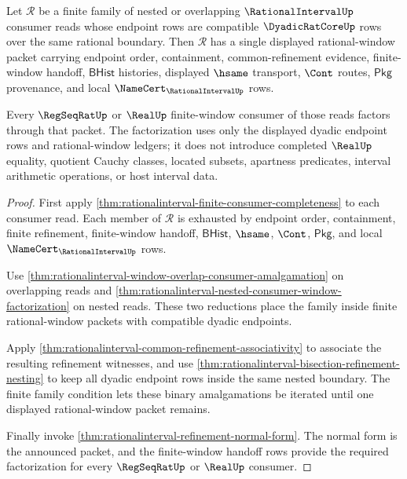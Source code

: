 



\begin{theorem}
\label{thm:rationalinterval-dyadic-nested-amalgamation-normal-form}
Let $\mathcal{R}$ be a finite family of nested or overlapping
$\RationalIntervalUp$ consumer reads whose endpoint rows are compatible
$\DyadicRatCoreUp$ rows over the same rational boundary. Then $\mathcal{R}$ has
a single displayed rational-window packet carrying endpoint order, containment,
common-refinement evidence, finite-window handoff, $\mathsf{BHist}$ histories,
displayed $\hsame$ transport, $\Cont$ routes, $\mathsf{Pkg}$ provenance, and
local $\NameCert_{\RationalIntervalUp}$ rows.

Every $\RegSeqRatUp$ or $\RealUp$ finite-window consumer of those reads factors
through that packet. The factorization uses only the displayed dyadic endpoint
rows and rational-window ledgers; it does not introduce completed $\RealUp$
equality, quotient Cauchy classes, located subsets, apartness predicates,
interval arithmetic operations, or host interval data.
\end{theorem}
\begin{proof}
First apply
\autoref{thm:rationalinterval-finite-consumer-completeness} to each consumer
read. Each member of $\mathcal{R}$ is exhausted by endpoint order,
containment, finite refinement, finite-window handoff, $\mathsf{BHist}$,
$\hsame$, $\Cont$, $\mathsf{Pkg}$, and local
$\NameCert_{\RationalIntervalUp}$ rows.

Use \autoref{thm:rationalinterval-window-overlap-consumer-amalgamation} on
overlapping reads and
\autoref{thm:rationalinterval-nested-consumer-window-factorization} on nested
reads. These two reductions place the family inside finite rational-window
packets with compatible dyadic endpoints.

Apply \autoref{thm:rationalinterval-common-refinement-associativity} to
associate the resulting refinement witnesses, and use
\autoref{thm:rationalinterval-bisection-refinement-nesting} to keep all dyadic endpoint
rows inside the same nested boundary. The finite family condition lets these
binary amalgamations be iterated until one displayed rational-window packet
remains.

Finally invoke
\autoref{thm:rationalinterval-refinement-normal-form}. The normal form is the
announced packet, and the finite-window handoff rows provide the required
factorization for every $\RegSeqRatUp$ or $\RealUp$ consumer.
\end{proof}

